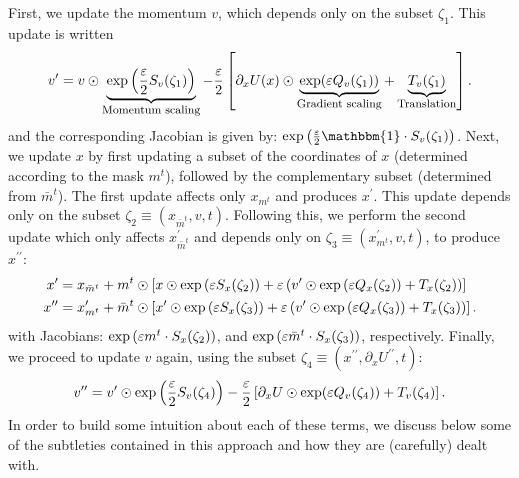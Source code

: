 \documentclass[main.tex]{subfiles}
\begin{document}
First, we update the momentum $v$, which depends only on the subset $\zeta_1$.
%
This update is written
%
\begin{equation}
  \vp = v \odot 
    \underbrace{\exp\left(\frac{\varepsilon}{2} S_{v}(\zeta_1)\right)}_{\text{\footnotesize{Momentum scaling}}}%
    - \frac{\varepsilon}{2}\left[\partial_{x} U(x)%
    \odot\underbrace{\exp(\varepsilon Q_{v}(\zeta_1))}_{\text{\footnotesize{Gradient scaling}}}%
    + \underbrace{T_v(\zeta_1)}_{\text{\footnotesize{Translation}}}\right].
    \label{eq:update_momentum_forward1}
\end{equation}
%
and the corresponding Jacobian is given by: $\exp{\left(\frac{\eps}{2}\mathbbm{1} \cdot S_{v}(\zeta_1)\right)}$.
%
Next, we update $x$ by first updating a subset of the coordinates of $x$ (determined according to the mask $m^t$),
followed by the complementary subset (determined from $\bar m^{t}$).
%
The first update affects only $x_{m^{t}}$ and produces $x^{\prime}$.
%
This update depends only on the subset $\zeta_2 \equiv (x_{\bar m^t}, v, t)$.
%
Following this, we perform the second update which only affects $x_{\bar{m}^t}^{\prime}$ and depends only on $\zeta_3
\equiv (x_{m^t}^{\prime}, v, t)$, to produce $x^{\prime\prime}$:
%
\begin{align}
  x^{\prime} &= x_{\bar{m}^t} + m^{t}\odot\left[x \odot \exp{(\eps S_x(\zeta_2))} + \eps\left(v^{\prime}\odot%
    \exp{(\eps Q_x(\zeta_2))} + T_x(\zeta_2)\right)\right]\\
  x^{\prime\prime} &= x^{\prime}_{m^t} + \bar m^t \odot \left[x^{\prime} \odot \exp{(\eps S_x(\zeta_3))} +%
    \eps\left(v^{\prime} \odot \exp{(\eps Q_x(\zeta_3))} + T_x(\zeta_3)\right)\right].
\end{align}
%
with Jacobians: $\exp{({\varepsilon}m^{t} \cdot S_x(\zeta_2))}$, and $\exp{({\varepsilon}\bar m^t \cdot S_x(\zeta_3))}$, respectively. 
%
Finally, we proceed to update $v$ again, using the subset $\zeta_4 \equiv (x^{\prime\prime}, \partial_{x}
U^{\prime\prime}, t)$: 
%
\begin{equation} 
  {v^{\prime\prime}} = {v^{\prime}} \odot \exp\left(\frac{\varepsilon}{2} S_v(\zeta_4)\right) - \frac{\varepsilon}{2}\left[\partial_{x} U
  \odot \exp(\varepsilon Q_v(\zeta_4)) + T_v(\zeta_4)\right].
    \label{eq:update_momentum_forward2}
\end{equation}
%
In order to build some intuition about each of these terms, we discuss below some of the subtleties contained in this
approach and how they are (carefully) dealt with.
\end{document}
